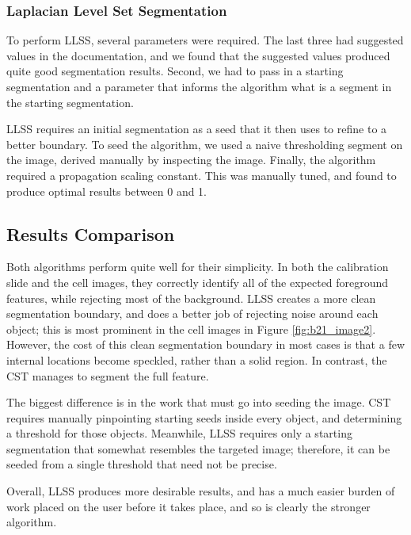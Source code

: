 \documentclass{article}
\begin{document}
\subsubsection*{Laplacian Level Set Segmentation}
To perform LLSS, several parameters were required. The last three had suggested values in the documentation, and we found that the suggested values produced quite good segmentation results. Second, we had to pass in a starting segmentation and a parameter that informs the algorithm what is a segment in the starting segmentation.

LLSS requires an initial segmentation as a seed that it then uses to refine to a better boundary. To seed the algorithm, we used a naive thresholding segment on the image, derived manually by inspecting the image. Finally, the algorithm required a propagation scaling constant. This was manually tuned, and found to produce optimal results between 0 and 1.

\subsection*{Results Comparison}
Both algorithms perform quite well for their simplicity. In both the calibration slide and the cell images, they correctly identify all of the expected foreground features, while rejecting most of the background. LLSS creates a more clean segmentation boundary, and does a better job of rejecting noise around each object; this is most prominent in the cell images in Figure \ref{fig:b21_image2}. However, the cost of this clean segmentation boundary in most cases is that a few internal locations become speckled, rather than a solid region. In contrast, the CST manages to segment the full feature.

The biggest difference is in the work that must go into seeding the image. CST requires manually pinpointing starting seeds inside every object, and determining a threshold for those objects. Meanwhile, LLSS requires only a starting segmentation that somewhat resembles the targeted image; therefore, it can be seeded from a single threshold that need not be precise.

Overall, LLSS produces more desirable results, and has a much easier burden of work placed on the user before it takes place, and so is clearly the stronger algorithm.
\end{document}
